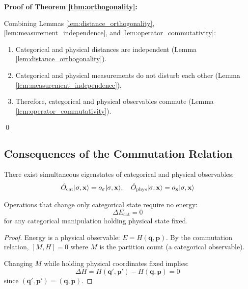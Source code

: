 \textbf{Proof of Theorem \ref{thm:orthogonality}:}

Combining Lemmas \ref{lem:distance_orthogonality}, \ref{lem:measurement_independence}, and \ref{lem:operator_commutativity}:
\begin{enumerate}
    \item Categorical and physical distances are independent (Lemma \ref{lem:distance_orthogonality}).
    \item Categorical and physical measurements do not disturb each other (Lemma \ref{lem:measurement_independence}).
    \item Therefore, categorical and physical observables commute (Lemma \ref{lem:operator_commutativity}).
\end{enumerate}
\qed

\subsection{Consequences of the Commutation Relation}

\begin{corollary}
\label{cor:simultaneous}
There exist simultaneous eigenstates of categorical and physical observables:
\begin{equation}
\hat{O}_{\mathrm{cat}} |\sigma, \mathbf{x}\rangle = o_{\sigma} |\sigma, \mathbf{x}\rangle, \quad \hat{O}_{\mathrm{phys}} |\sigma, \mathbf{x}\rangle = o_{\mathbf{x}} |\sigma, \mathbf{x}\rangle
\end{equation}
\end{corollary}

\begin{corollary}
\label{cor:zero_energy}
Operations that change only categorical state require no energy:
\begin{equation}
\Delta E_{\text{cat}} = 0
\end{equation}
for any categorical manipulation holding physical state fixed.
\end{corollary}

\begin{proof}
Energy is a physical observable: $E = H(\mathbf{q}, \mathbf{p})$. By the commutation relation, $[M, H] = 0$ where $M$ is the partition count (a categorical observable).

Changing $M$ while holding physical coordinates fixed implies:
\begin{equation}
\Delta H = H(\mathbf{q}', \mathbf{p}') - H(\mathbf{q}, \mathbf{p}) = 0
\end{equation}
since $(\mathbf{q}', \mathbf{p}') = (\mathbf{q}, \mathbf{p})$.
\end{proof}


